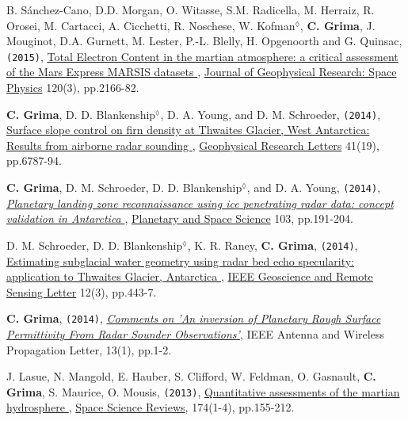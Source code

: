 \begin{etaremune}
\item
  B. Sánchez-Cano, D.D. Morgan, O. Witasse, S.M. Radicella, M. Herraiz, R. Orosei, M. Cartacci, A. Cicchetti, R. Noschese, W. Kofman$^\lozenge$, \textbf{C. Grima}, J. Mouginot, D.A. Gurnett, M. Lester, P.-L. Blelly, H. Opgenoorth and G. Quinsac, \texttt{(2015)}, \href{http://onlinelibrary.wiley.com/doi/10.1002/2014JA020630/abstract}{Total Electron Content in the martian atmosphere: a critical assessment of the Mars Express MARSIS datasets  \aiOpenAccessSquare}, \ul{Journal of Geophysical Research: Space Physics} 120(3), pp.2166-82.

\item
  \textbf{C. Grima}, D. D. Blankenship$^\lozenge$, D. A. Young, and D. M. Schroeder, \texttt{(2014)}, \href{http://onlinelibrary.wiley.com/enhanced/doi/10.1002/2014GL061635/}{Surface slope control on firn density at Thwaites Glacier, West Antarctica: Results from airborne radar sounding  \aiOpenAccessSquare}, \ul{Geophysical Research Letters} 41(19), pp.6787-94.

\item
  \textbf{C. Grima}, D. M. Schroeder, D. D. Blankenship$^\lozenge$, and D. A. Young, \texttt{(2014)}, \href{http://www.sciencedirect.com/science/article/pii/S0032063314002244}{\emph{Planetary landing zone reconnaissance using ice penetrating radar data: concept validation in Antarctica \aiOpenAccessSquare}}, \ul{Planetary and Space Science} 103, pp.191-204.

\item
  D. M. Schroeder, D. D. Blankenship$^\lozenge$, K. R. Raney, \textbf{C. Grima}, \texttt{(2014)},
  \href{http://ieeexplore.ieee.org/xpl/login.jsp?tp=\&arnumber=6901268\&url=http\%3A\%2F\%2Fieeexplore.ieee.org\%2Fstamp\%2Fstamp.jsp\%3Ftp\%3D\%26arnumber\%3D6901268}{Estimating subglacial water geometry using radar bed echo specularity: application to Thwaites Glacier, Antarctica \aiOpenAccessSquare}, \ul{IEEE Geoscience and Remote Sensing Letter} 12(3), pp.443-7.

\item
  \textbf{C. Grima}, \texttt{(2014)}, \emph{\href{http://ieeexplore.ieee.org/xpl/articleDetails.jsp?tp=\&arnumber=6827185\&queryText\%3Dgrima}{Comments on 'An inversion of Planetary Rough Surface Permittivity From Radar Sounder Observations'}}, IEEE Antenna and Wireless Propagation Letter, 13(1), pp.1-2.
  
\item
  J. Lasue, N. Mangold, E. Hauber, S. Clifford, W. Feldman, O. Gasnault, \textbf{C. Grima}, S. Maurice, O. Mousis, \texttt{(2013)},
  \href{https://link.springer.com/article/10.1007/s11214-012-9946-5}{Quantitative assessments of the martian hydrosphere \aiOpenAccessSquare}, \ul{Space Science Reviews}, 174(1-4), pp.155-212.
  

\end{etaremune}
